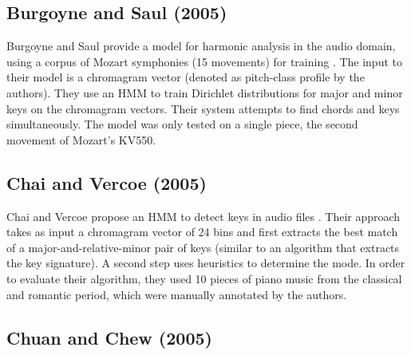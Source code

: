 \subsection{Burgoyne and Saul (2005)}
Burgoyne and Saul provide a model for harmonic analysis in the audio domain, using a corpus of Mozart symphonies (15 movements) for training \cite{burgoyne_learning_2005}. The input to their model is a chromagram vector (denoted as pitch-class profile by the authors). They use an HMM to train Dirichlet distributions for major and minor keys on the chromagram vectors. Their system attempts to find chords and keys simultaneously. The model was only tested on a single piece, the second movement of Mozart's KV550.

\subsection{Chai and Vercoe (2005)}
Chai and Vercoe propose an HMM to detect keys in audio files \cite{chai_detection_2005}. Their approach takes as input a chromagram vector of 24 bins and first extracts the best match of a major-and-relative-minor pair of keys (similar to an algorithm that extracts the key signature). A second step uses heuristics to determine the mode. In order to evaluate their algorithm, they used 10 pieces of piano music from the classical and romantic period, which were manually annotated by the authors.

\subsection{Chuan and Chew (2005)}

